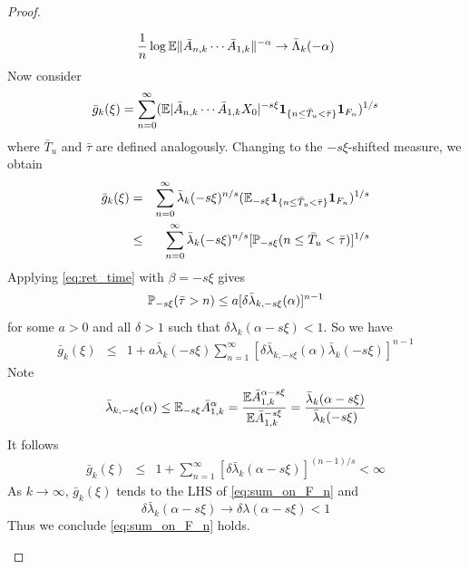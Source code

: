 \documentclass{article}
\theoremstyle{remark}
\begin{document}
\begin{proof}
\begin{enumerate}
    \begin{equation*}
      {1 \over n} \log \E \|\bar A_{n,k} \cdots \bar A_{1,k}\|^{-\alpha}
      \to
      \bar \Lambda_{k}(-\alpha)
    \end{equation*}
    Now consider
    \begin{eqnarray*}
      \bar g_k(\xi) = \sum_{n=0}^\infty
      (\E |\bar A_{n,k} \cdots \bar A_{1,k} X_0|^{-s\xi}
      \1{n \leq \bar T_u < \bar \tau}
      \I_{F_n}
      )^{1/s}
    \end{eqnarray*}
    where $\bar T_u$ and $\bar \tau$ are defined analogously. Changing
    to the $-s\xi$-shifted measure, we obtain
    \begin{eqnarray*}
      \bar g_k(\xi) &=& \sum_{n=0}^\infty \bar \lambda_{k}(-s\xi)^{n/s}
      (\E_{-s\xi} \1{n \leq \bar T_u < \bar \tau} \I_{F_n})^{1/s} \\
      &\leq&
      \sum_{n=0}^\infty \bar \lambda_{k}(-s\xi)^{n/s}
      [\P_{-s\xi}(n \leq \bar T_u < \bar \tau)]^{1/s}
    \end{eqnarray*}
    Applying \eqref{eq:ret_time} with $\beta = -s\xi$ gives
    \begin{eqnarray*}
      \P_{-s\xi}(\bar \tau > n) \leq a [\delta \bar \lambda_{k, -s\xi}(\alpha)]^{n-1}
    \end{eqnarray*}
    for some $a > 0$ and all $\delta > 1$ such that
    $\delta \lambda_k(\alpha - s\xi) < 1$. So we have
    \begin{eqnarray*}
      \bar g_k(\xi) &\leq& 1 + a \bar \lambda_k(-s\xi)\sum_{n=1}^\infty
      [\delta \bar \lambda_{k, -s\xi}(\alpha) \bar \lambda_k(-s\xi)]^{n-1} 
    \end{eqnarray*}
    Note
    \begin{eqnarray*}
      \bar \lambda_{k, -s\xi}(\alpha)
      \leq
      \E_{-s\xi} \bar A_{1,k}^\alpha 
      = {
        \E \bar A_{1,k}^{\alpha - s\xi}
        \over
        \E \bar A_{1,k}^{-s\xi}
      }
      = {
        \bar \lambda_k(\alpha - s\xi)
        \over
        \bar \lambda_k(-s\xi)
      }
    \end{eqnarray*}
    It follows
    \begin{eqnarray*}
      \bar g_k(\xi) &\leq& 1 + \sum_{n=1}^\infty
      [\delta \bar \lambda_k(\alpha - s\xi)]^{(n-1)/s}
      < \infty
    \end{eqnarray*}
    As $k \to \infty$, $\bar g_k(\xi)$ tends to the LHS of
    \eqref{eq:sum_on_F_n} and
    \[
    \delta \bar \lambda_k(\alpha - s\xi) \to \delta \lambda(\alpha - s\xi)
    < 1
    \]
    Thus we conclude \eqref{eq:sum_on_F_n} holds.
    \end{enumerate}
\end{proof}
\end{document}
